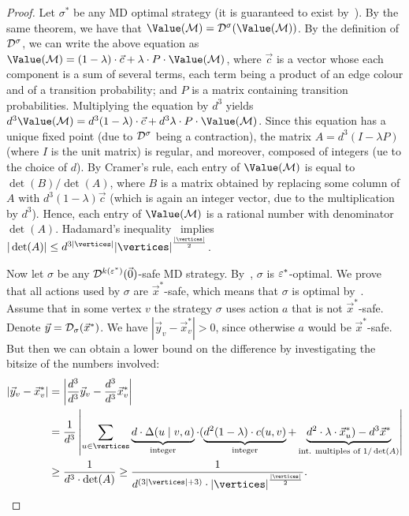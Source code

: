 \begin{proof}
 Let $\sigma^*$ be any MD optimal strategy (it is guaranteed 
to exist by~). By the same theorem, we have that 
$\Value(\mdp)=\discOP^{\sigma}(\Value(\mdp))$. By the definition of 
$\mathcal{D}^{\sigma}$, we can write the above equation as $\Value(\mdp)= 
(1-\lambda)\cdot \vec{c}+\lambda \cdot P\cdot \Value(\mdp)$, where $\vec{c}$ is 
a vector whose each 
component 
is a 
sum of several terms, each term being a product of an edge colour and of a 
transition probability; and $P$ is a matrix containing 
transition 
probabilities. Multiplying the equation by $d^3$ yields $d^3\Value(\mdp)= 
d^3(1-\lambda)\cdot \vec{c}+d^3\lambda \cdot P\cdot \Value(\mdp)$. Since this equation has a unique fixed point (due to 
$\mathcal{D}^\sigma$ being a contraction), the matrix $A = d^3(I - \lambda P)$ (where $ I $ is the unit matrix) is 
regular, and moreover, composed of integers (ue to the choice of $ d $). By Cramer's rule, each entry of $\Value(\mdp)$ is equal to 
$\det(B)/\det(A)$, where $B$ is a matrix obtained by replacing some column of 
$A$ with $d^3(1-\lambda)\vec{c}$ (which is again an integer vector, due to the multiplication by $ d^3 $). Hence, each entry of $\Value(\mdp)$ is a rational number with denominator $\det(A)$. Hadamard's inequality~\cite{Garling:07} implies $|\det(A)|\leq d^{3|\vertices|}{|\vertices|}^{\frac{|\vertices|}{2}}$.

Now let $\sigma$ be any $\mathcal{D}^{k(\varepsilon^*)}(\vec{0})$-safe MD strategy. By~, $\sigma$ is $\varepsilon^*$-optimal. We prove that all actions used by $\sigma$ are $\vec{x}^*$-safe, which means that $\sigma$ is optimal by~. Assume that in some vertex $v$ the strategy $\sigma$ uses action $a$ that is not $\vec{x}^*$-safe. Denote $\vec{y}=\mathcal{D}_\sigma(\vec{x}^*)$. We have $ |\vec{y}_v - \vec{x}^*_v| > 0 $, since otherwise $a$ would be $\vec{x}^*$-safe. But then we can obtain a lower bound on the difference by investigating the bitsize of the numbers involved:
\begin{align*}
|\vec{y}_v - \vec{x}^*_v| &= \left|\frac{d^3}{d^3}\vec{y}_v - \frac{d^3}{d^3}\vec{x}^*_v\right|
\\
&=\frac{1}{d^3}\left|\sum_{u \in \vertices} 
\underbrace{d\cdot\probTranFunc(u \mid v,a)}_{\text{integer}} \cdot( \underbrace{d^2(1-\lambda)\cdot \colouring(u,v)}_{\text{integer}} + 
\underbrace{d^2\cdot\lambda \cdot \vec{x}^*_u ) - d^3\vec{x}^*}_{\text{int. multiples of $1/\det(A)$}}\right| \\
&\geq \frac{1}{d^3\cdot \det(A)}\geq \frac{1}{d^{(3|\vertices|+3)}\cdot{|\vertices|}^{\frac{|\vertices|}{2}}}.
\end{align*}


\end{proof}
